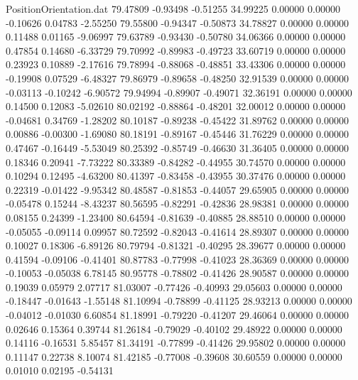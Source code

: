 \begin{filecontents}{PositionOrientation.dat}
  79.47809   -0.93498   -0.51255    34.99225    0.00000    0.00000   -0.10626    0.04783   -2.55250
  79.55800   -0.94347   -0.50873    34.78827    0.00000    0.00000    0.11488    0.01165   -9.06997
  79.63789   -0.93430   -0.50780    34.06366    0.00000    0.00000    0.47854    0.14680   -6.33729
  79.70992   -0.89983   -0.49723    33.60719    0.00000    0.00000    0.23923    0.10889   -2.17616
  79.78994   -0.88068   -0.48851    33.43306    0.00000    0.00000   -0.19908    0.07529   -6.48327
  79.86979   -0.89658   -0.48250    32.91539    0.00000    0.00000   -0.03113   -0.10242   -6.90572
  79.94994   -0.89907   -0.49071    32.36191    0.00000    0.00000    0.14500    0.12083   -5.02610
  80.02192   -0.88864   -0.48201    32.00012    0.00000    0.00000   -0.04681    0.34769   -1.28202
  80.10187   -0.89238   -0.45422    31.89762    0.00000    0.00000    0.00886   -0.00300   -1.69080
  80.18191   -0.89167   -0.45446    31.76229    0.00000    0.00000    0.47467   -0.16449   -5.53049
  80.25392   -0.85749   -0.46630    31.36405    0.00000    0.00000    0.18346    0.20941   -7.73222
  80.33389   -0.84282   -0.44955    30.74570    0.00000    0.00000    0.10294    0.12495   -4.63200
  80.41397   -0.83458   -0.43955    30.37476    0.00000    0.00000    0.22319   -0.01422   -9.95342
  80.48587   -0.81853   -0.44057    29.65905    0.00000    0.00000   -0.05478    0.15244   -8.43237
  80.56595   -0.82291   -0.42836    28.98381    0.00000    0.00000    0.08155    0.24399   -1.23400
  80.64594   -0.81639   -0.40885    28.88510    0.00000    0.00000   -0.05055   -0.09114    0.09957
  80.72592   -0.82043   -0.41614    28.89307    0.00000    0.00000    0.10027    0.18306   -6.89126
  80.79794   -0.81321   -0.40295    28.39677    0.00000    0.00000    0.41594   -0.09106   -0.41401
  80.87783   -0.77998   -0.41023    28.36369    0.00000    0.00000   -0.10053   -0.05038    6.78145
  80.95778   -0.78802   -0.41426    28.90587    0.00000    0.00000    0.19039    0.05979    2.07717
  81.03007   -0.77426   -0.40993    29.05603    0.00000    0.00000   -0.18447   -0.01643   -1.55148
  81.10994   -0.78899   -0.41125    28.93213    0.00000    0.00000   -0.04012   -0.01030    6.60854
  81.18991   -0.79220   -0.41207    29.46064    0.00000    0.00000    0.02646    0.15364    0.39744
  81.26184   -0.79029   -0.40102    29.48922    0.00000    0.00000    0.14116   -0.16531    5.85457
  81.34191   -0.77899   -0.41426    29.95802    0.00000    0.00000    0.11147    0.22738    8.10074
  81.42185   -0.77008   -0.39608    30.60559    0.00000    0.00000    0.01010    0.02195   -0.54131

\end{filecontents}
